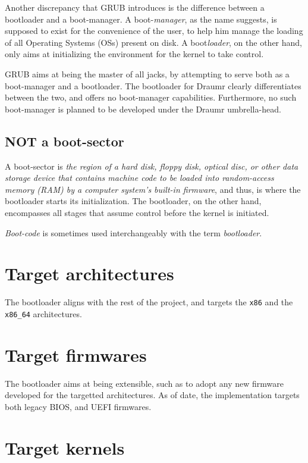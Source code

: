 \documentclass[11pt,a4paper,oneside]{report}
\begin{document}
Another discrepancy that GRUB introduces is the difference between a bootloader and a boot-manager. A boot-\emph{manager}, as the name suggests, is supposed to exist for the convenience of the user, to help him manage the loading of all Operating Systems (OSs) present on disk. A boot\emph{loader}, on the other hand, only aims at initializing the environment for the kernel to take control.

GRUB aims at being the master of all jacks, by attempting to serve both as a boot-manager and a bootloader. The bootloader for Draumr clearly differentiates between the two, and offers no boot-manager capabilities. Furthermore, no such boot-manager is planned to be developed under the Draumr umbrella-head.

\subsection{NOT a boot-sector}

A boot-sector is \emph{the region of a hard disk, floppy disk, optical disc, or other data storage device that contains machine code to be loaded into random-access memory (RAM) by a computer system's built-in firmware}, and thus, is where the bootloader starts its initialization. The bootloader, on the other hand, encompasses all stages that assume control before the kernel is initiated. 

\emph{Boot-code} is sometimes used interchangeably with the term \emph{bootloader}. 

\section{Target architectures}

The bootloader aligns with the rest of the project, and targets the \texttt{x86} and the \texttt{x86\_64} architectures.

\section{Target firmwares}

The bootloader aims at being extensible, such as to adopt any new firmware developed for the targetted architectures. As of date, the implementation targets both legacy BIOS, and UEFI firmwares.

\section{Target kernels}
\end{document}

